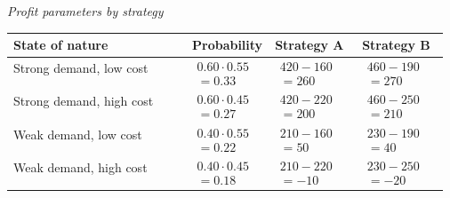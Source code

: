 		\begin{center}
			\textit{Profit parameters by strategy}
			\begin{tabular}{l p{0.17\linewidth} p{0.2\linewidth} p{0.2\linewidth}}
				\toprule
				State of nature & Probability & Strategy A & Strategy B \\
				\midrule
				Strong demand, low cost &
				$\begin{array}{l}
					0.60 \cdot 0.55\\
					= 0.33
				\end{array}$ &
				$\begin{array}{l}
					420 - 160\\
					= 260
				\end{array}$ &
				$\begin{array}{l}
					460 - 190\\
					= 270
				\end{array}$ \\
				Strong demand, high cost &
				$\begin{array}{l}
					0.60 \cdot 0.45\\
					= 0.27
				\end{array}$ &
				$\begin{array}{l}
					420 - 220\\
					= 200
				\end{array}$ &
				$\begin{array}{l}
					460 - 250\\
					= 210
				\end{array}$ \\
				Weak demand, low cost &
				$\begin{array}{l}
					0.40 \cdot 0.55\\
					= 0.22
				\end{array}$ &
				$\begin{array}{l}
					210 - 160\\
					= 50
				\end{array}$ &
				$\begin{array}{l}
					230 - 190\\
					= 40
				\end{array}$ \\
				Weak demand, high cost &
				$\begin{array}{l}
					0.40 \cdot 0.45\\
					= 0.18
				\end{array}$ &
				$\begin{array}{l}
					210 - 220\\
					= -10
				\end{array}$ &
				$\begin{array}{l}
					230 - 250\\
					= -20
				\end{array}$ \\
				\bottomrule
			\end{tabular}
		\end{center}
